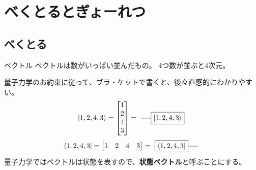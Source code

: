 \documentclass[dvipdfm]{beamer}
\begin{document}
\section{べくとるとぎょーれつ}



\subsection{べくとる}

\begin{frame}{ベクトル}
    ベクトルは数がいっぱい並んだもの。
    4つ数が並ぶと4次元。

    量子力学のお約束に従って、ブラ・ケットで書くと、後々直感的にわかりやすい。
    \begin{equation*}
        \ket{1,2,4,3}
        =
        \mqty[1\\2\\4\\3]
        =
        \vcenter{\hbox{
            \begin{tikzpicture}
                \node at(0,0)[draw,rectangle](ket){$\ket{1,2,4,3}$};
                \draw(ket.west)--++(-.5,0);
            \end{tikzpicture}
        }}
    \end{equation*}
    \begin{equation*}
        \bra{1,2,4,3}
        =
        \mqty[1&2&4&3]
        =
        \vcenter{\hbox{
            \begin{tikzpicture}
                \node at(0,0)[draw,rectangle](ket){$\bra{1,2,4,3}$};
                \draw(ket.east)--++(.5,0);
            \end{tikzpicture}
        }}
    \end{equation*}
    量子力学ではベクトルは状態を表すので、\alert{\textbf{状態ベクトル}}と呼ぶことにする。
\end{frame}
\end{document}

